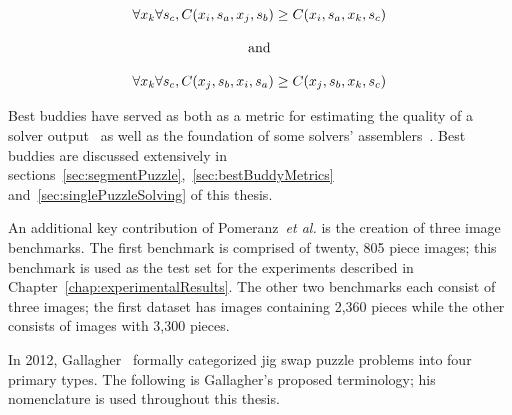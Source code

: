 \begin{equation} \label{eq:pomeranzBestBuddyDefinition}
\centering
\begin{split}
	\begin{matrix}
		\forall{x_{k}}\forall{s_c},C(x_i, s_a, x_j, s_b) \geq C(x_i, s_a, x_k, s_c)
		\\
		\\
		\textnormal{and}
		\\
		\\
		\forall{x_{k}}\forall{s_c},C(x_j, s_b, x_i, s_a) \geq C(x_j, s_b, x_k, s_c)
	\end{matrix}
\end{split}
\end{equation} 


Best buddies have served as both as a metric for estimating the quality of a solver output~\cite{sholomon2013} as well as the foundation of some solvers' assemblers~\cite{paikin2015}.  Best buddies are discussed extensively in sections~\ref{sec:segmentPuzzle},~\ref{sec:bestBuddyMetrics} and~\ref{sec:singlePuzzleSolving} of this thesis.

An additional key contribution of Pomeranz~\textit{et al.} is the creation of three image benchmarks.  The first benchmark is comprised of twenty, 805 piece images; this benchmark is used as the test set for the experiments described in Chapter~\ref{chap:experimentalResults}. The other two benchmarks each consist of three images; the first dataset has images containing 2,360 pieces while the other consists of images with 3,300 pieces.

In 2012, Gallagher~\cite{gallagher2012} formally categorized jig swap puzzle problems into four primary types.  The following is Gallagher's proposed terminology; his nomenclature is used throughout this thesis.


